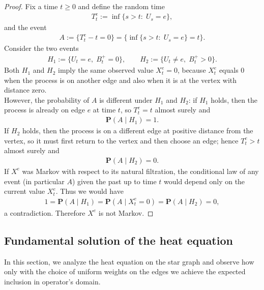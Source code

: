 \documentclass[11pt,a4paper]{article}
\theoremstyle{plain}
\theoremstyle{definition}
\theoremstyle{remark}
\begin{document}
		\begin{proof}
			Fix a time $t\ge 0$ and define the random time
			\begin{align*}
				T^e_t:=\inf\{s>t:\;U_s=e\},
			\end{align*}
			and the event
			\begin{align*}
				A:=\{T^e_t-t=0\}=\{\inf\{s>t:\;U_s=e\}=t\}.
			\end{align*}
			Consider the two events
			\begin{align*}
				H_1:=\{U_t=e,\;B^+_t=0\},\qquad H_2:=\{U_t\neq e,\;B^+_t>0\}.
			\end{align*}
			Both $H_1$ and $H_2$ imply the same observed value $X^e_t=0$, because $X^e_t$ equals $0$ when the process is on another edge and also when it is at the vertex with distance zero.\\
			However, the probability of $A$ is different under $H_1$ and $H_2$:
			if $H_1$ holds, then the process is already on edge $e$ at time $t$, so $T^e_t=t$ almost surely and
			\begin{align*}
				\mathbf{P}(A\mid H_1)=1.
			\end{align*}
			If $H_2$ holds, then the process is on a different edge at positive distance from the vertex, so it must first return to the vertex and then choose an edge; hence $T^e_t>t$ almost surely and
			\begin{align*}
				\mathbf{P}(A\mid H_2)=0.
			\end{align*}
			If $X^e$ was Markov with respect to its natural filtration, the conditional law of any event (in particular $A$) given the past up to time $t$ would depend only on the current value $X^e_t$. Thus we would have
			\begin{align*}
				1= \mathbf{P}(A\mid H_1)=\mathbf{P}(A\mid X^e_t=0)=\mathbf{P}(A\mid H_2)=0,
			\end{align*}
			a contradiction. Therefore $X^e$ is not Markov.
		\end{proof}
		
		
		\subsection{Fundamental solution of the heat equation}
		In this section, we analyze the heat equation on the star graph and observe how only with the choice of uniform weights on the edges we achieve the expected inclusion in  operator's domain.
		
\end{document}
